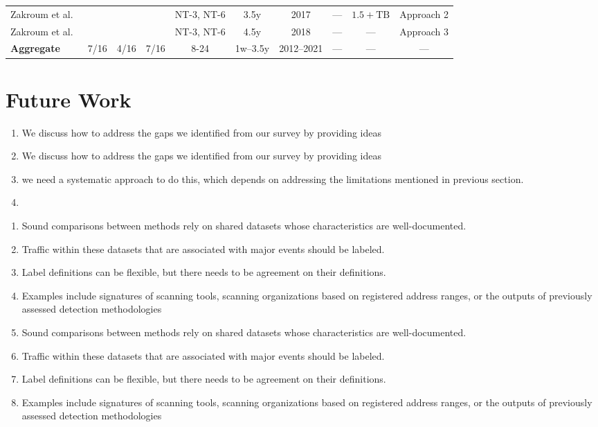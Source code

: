 \documentclass[manuscript,nonacm]{acmart}
\newcommand{\cmark}{\ding{51}}%
\begin{document}
\begin{table}[h!]
\begin{tabular}{@{}lccccccccc@{}}
        Zakroum et al.~\cite{2022zakroum,2018zakroum}
        & ~\cite{2018zakroum}
        & & \cmark
        & NT-3, NT-6
        & 3.5y & 2017
        & --- & $1.5+\mathrm{TB}$
        &  Approach 2 \\

        Zakroum et al.~\cite{2023zakroum}
        & ~\cite{2023zakroum}
        & &
        & NT-3, NT-6
        & 4.5y & 2018
        & --- & ---
        & Approach 3 \\

        \midrule
        \textbf{Aggregate}
        & 7/16
        & 4/16 & 7/16
        & 8-24
        & 1w--3.5y & 2012--2021
        & --- & ---
        & --- \\
        \bottomrule
    \end{tabular}
\end{table}

\label{sec:fw}
\section{Future Work}

\begin{enumerate}
    \item We discuss how to address the gaps we identified from our survey by providing ideas 
    \item We discuss how to address the gaps we identified from our survey by providing ideas 
    \item we need a systematic approach to do this, which depends on addressing the limitations mentioned in previous section.
    \item 
\end{enumerate}

\begin{enumerate}
    \item Sound comparisons between methods rely on shared datasets whose characteristics are well-documented.
    \item Traffic within these datasets that are associated with major events should be labeled.
    \item Label definitions can be flexible, but there needs to be agreement on their definitions.
    \item Examples include signatures of scanning tools, scanning organizations based on registered address ranges, or the outputs of previously assessed detection methodologies
    \item Sound comparisons between methods rely on shared datasets whose characteristics are well-documented.
    \item Traffic within these datasets that are associated with major events should be labeled.
    \item Label definitions can be flexible, but there needs to be agreement on their definitions.
    \item Examples include signatures of scanning tools, scanning organizations based on registered address ranges, or the outputs of previously assessed detection methodologies
\end{enumerate}
\end{document}
